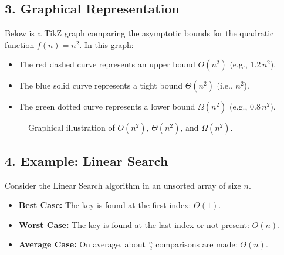 \subsection*{\large \textbf{3. Graphical Representation}}

Below is a TikZ graph comparing the asymptotic bounds for the quadratic function \( f(n)=n^2 \). In this graph:
\begin{itemize}[leftmargin=2em]
  \item The red dashed curve represents an upper bound \( O(n^2) \) (e.g., \( 1.2\,n^2 \)).
  \item The blue solid curve represents a tight bound \( \Theta(n^2) \) (i.e., \( n^2 \)).
  \item The green dotted curve represents a lower bound \( \Omega(n^2) \) (e.g., \( 0.8\,n^2 \)).
\end{itemize}

\begin{figure}[H]
\centering
{}
\caption{Graphical illustration of \( O(n^2) \), \(\Theta(n^2)\), and \(\Omega(n^2)\).}
\end{figure}

\subsection*{\large \textbf{4. Example: Linear Search}}

Consider the Linear Search algorithm in an unsorted array of size \( n \).

\begin{itemize}[leftmargin=2em]
  \item \textbf{Best Case:} The key is found at the first index: \(\Theta(1)\).
  \item \textbf{Worst Case:} The key is found at the last index or not present: \( O(n) \).
  \item \textbf{Average Case:} On average, about \( \frac{n}{2} \) comparisons are made: \(\Theta(n)\).
\end{itemize}


